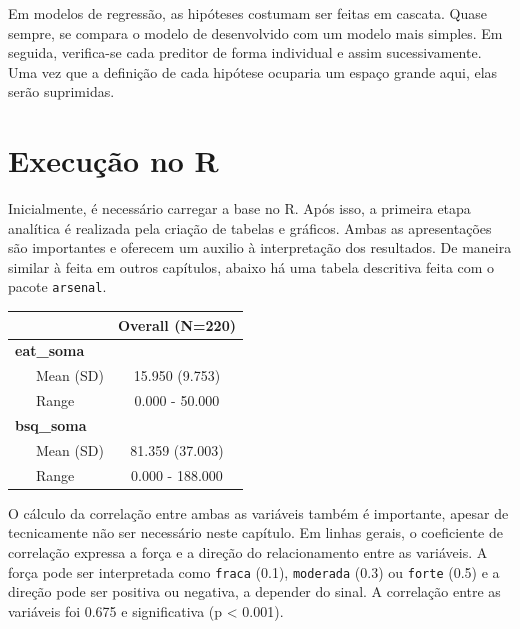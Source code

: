 \documentclass[
]{book}
\newenvironment{Shaded}{\begin{snugshade}}{\end{snugshade}}
\newcommand{\KeywordTok}[1]{\textcolor[rgb]{0.13,0.29,0.53}{\textbf{#1}}}
\newcommand{\NormalTok}[1]{#1}
\newcommand{\OperatorTok}[1]{\textcolor[rgb]{0.81,0.36,0.00}{\textbf{#1}}}
\newcommand{\StringTok}[1]{\textcolor[rgb]{0.31,0.60,0.02}{#1}}
\begin{document}
Em modelos de regressão, as hipóteses costumam ser feitas em cascata. Quase sempre, se compara o modelo de desenvolvido com um modelo mais simples. Em seguida, verifica-se cada preditor de forma individual e assim sucessivamente. Uma vez que a definição de cada hipótese ocuparia um espaço grande aqui, elas serão suprimidas.

\hypertarget{execuuxe7uxe3o-no-r-14}{%
\section{Execução no R}\label{execuuxe7uxe3o-no-r-14}}

Inicialmente, é necessário carregar a base no R. Após isso, a primeira etapa analítica é realizada pela criação de tabelas e gráficos. Ambas as apresentações são importantes e oferecem um auxilio à interpretação dos resultados. De maneira similar à feita em outros capítulos, abaixo há uma tabela descritiva feita com o pacote \texttt{arsenal}.

\begin{Shaded}
\end{Shaded}

\begin{longtable}[]{@{}lc@{}}
\toprule
& Overall (N=220)\tabularnewline
\midrule
\endhead
\textbf{eat\_soma} &\tabularnewline
~~~Mean (SD) & 15.950 (9.753)\tabularnewline
~~~Range & 0.000 - 50.000\tabularnewline
\textbf{bsq\_soma} &\tabularnewline
~~~Mean (SD) & 81.359 (37.003)\tabularnewline
~~~Range & 0.000 - 188.000\tabularnewline
\bottomrule
\end{longtable}

O cálculo da correlação entre ambas as variáveis também é importante, apesar de tecnicamente não ser necessário neste capítulo. Em linhas gerais, o coeficiente de correlação expressa a força e a direção do relacionamento entre as variáveis. A força pode ser interpretada como \texttt{fraca} (0.1), \texttt{moderada} (0.3) ou \texttt{forte} (0.5) \citep{Cohen1988} e a direção pode ser positiva ou negativa, a depender do sinal. A correlação entre as variáveis foi 0.675 e significativa (p \textless{} 0.001).
\end{document}
